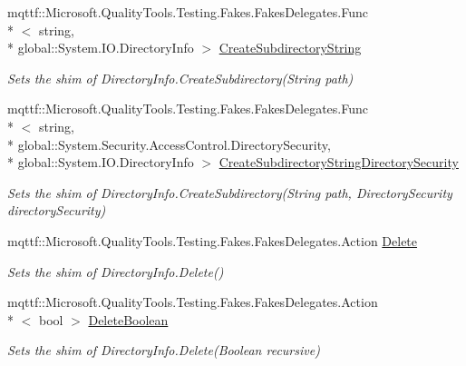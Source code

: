 \begin{DoxyCompactItemize}
mqttf\-::\-Microsoft.\-Quality\-Tools.\-Testing.\-Fakes.\-Fakes\-Delegates.\-Func\\*
$<$ string, \\*
global\-::\-System.\-I\-O.\-Directory\-Info $>$ \hyperlink{class_system_1_1_i_o_1_1_fakes_1_1_shim_directory_info_a87df951a72f08e47ebe185aceab18913}{Create\-Subdirectory\-String}
\begin{DoxyCompactList}\small\item\em Sets the shim of Directory\-Info.\-Create\-Subdirectory(\-String path)\end{DoxyCompactList}\item 
mqttf\-::\-Microsoft.\-Quality\-Tools.\-Testing.\-Fakes.\-Fakes\-Delegates.\-Func\\*
$<$ string, \\*
global\-::\-System.\-Security.\-Access\-Control.\-Directory\-Security, \\*
global\-::\-System.\-I\-O.\-Directory\-Info $>$ \hyperlink{class_system_1_1_i_o_1_1_fakes_1_1_shim_directory_info_ad60e4272b3ffddf45efd9fff6f7cfc54}{Create\-Subdirectory\-String\-Directory\-Security}
\begin{DoxyCompactList}\small\item\em Sets the shim of Directory\-Info.\-Create\-Subdirectory(\-String path, Directory\-Security directory\-Security)\end{DoxyCompactList}\item 
mqttf\-::\-Microsoft.\-Quality\-Tools.\-Testing.\-Fakes.\-Fakes\-Delegates.\-Action \hyperlink{class_system_1_1_i_o_1_1_fakes_1_1_shim_directory_info_ab35e587e5ad17a50a42511ae74bff271}{Delete}
\begin{DoxyCompactList}\small\item\em Sets the shim of Directory\-Info.\-Delete()\end{DoxyCompactList}\item 
mqttf\-::\-Microsoft.\-Quality\-Tools.\-Testing.\-Fakes.\-Fakes\-Delegates.\-Action\\*
$<$ bool $>$ \hyperlink{class_system_1_1_i_o_1_1_fakes_1_1_shim_directory_info_a968c582a05aec8749ecd79cb856ae0b0}{Delete\-Boolean}
\begin{DoxyCompactList}\small\item\em Sets the shim of Directory\-Info.\-Delete(\-Boolean recursive)\end{DoxyCompactList}\item 

\end{DoxyCompactItemize}
